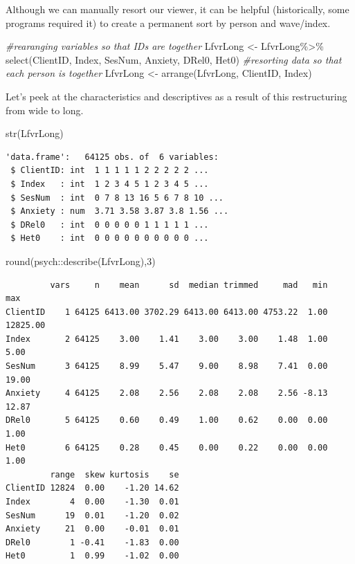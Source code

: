 \documentclass[
  english,
]{book}
\newenvironment{Shaded}{\begin{snugshade}}{\end{snugshade}}
\newcommand{\CommentTok}[1]{\textcolor[rgb]{0.56,0.35,0.01}{\textit{#1}}}
\newcommand{\DecValTok}[1]{\textcolor[rgb]{0.00,0.00,0.81}{#1}}
\newcommand{\FunctionTok}[1]{\textcolor[rgb]{0.00,0.00,0.00}{#1}}
\newcommand{\NormalTok}[1]{#1}
\newcommand{\OtherTok}[1]{\textcolor[rgb]{0.56,0.35,0.01}{#1}}
\newcommand{\SpecialCharTok}[1]{\textcolor[rgb]{0.00,0.00,0.00}{#1}}
\begin{document}
Although we can manually resort our viewer, it can be helpful (historically, some programs required it) to create a permanent sort by person and wave/index.

\begin{Shaded}
\begin{Highlighting}[]
\CommentTok{\#rearanging variables so that IDs are together}
\NormalTok{LfvrLong }\OtherTok{\textless{}{-}}\NormalTok{ LfvrLong}\SpecialCharTok{\%\textgreater{}\%}
  \FunctionTok{select}\NormalTok{(ClientID, Index, SesNum, Anxiety, DRel0, Het0)}
\CommentTok{\#resorting data so that each person is together}
\NormalTok{LfvrLong }\OtherTok{\textless{}{-}} \FunctionTok{arrange}\NormalTok{(LfvrLong, ClientID, Index)}
\end{Highlighting}
\end{Shaded}

Let's peek at the characteristics and descriptives as a result of this restructuring from wide to long.

\begin{Shaded}
\begin{Highlighting}[]
\FunctionTok{str}\NormalTok{(LfvrLong)}
\end{Highlighting}
\end{Shaded}

\begin{verbatim}
'data.frame':   64125 obs. of  6 variables:
 $ ClientID: int  1 1 1 1 1 2 2 2 2 2 ...
 $ Index   : int  1 2 3 4 5 1 2 3 4 5 ...
 $ SesNum  : int  0 7 8 13 16 5 6 7 8 10 ...
 $ Anxiety : num  3.71 3.58 3.87 3.8 1.56 ...
 $ DRel0   : int  0 0 0 0 0 1 1 1 1 1 ...
 $ Het0    : int  0 0 0 0 0 0 0 0 0 0 ...
\end{verbatim}

\begin{Shaded}
\begin{Highlighting}[]
\FunctionTok{round}\NormalTok{(psych}\SpecialCharTok{::}\FunctionTok{describe}\NormalTok{(LfvrLong),}\DecValTok{3}\NormalTok{)}
\end{Highlighting}
\end{Shaded}

\begin{verbatim}
         vars     n    mean      sd  median trimmed     mad   min      max
ClientID    1 64125 6413.00 3702.29 6413.00 6413.00 4753.22  1.00 12825.00
Index       2 64125    3.00    1.41    3.00    3.00    1.48  1.00     5.00
SesNum      3 64125    8.99    5.47    9.00    8.98    7.41  0.00    19.00
Anxiety     4 64125    2.08    2.56    2.08    2.08    2.56 -8.13    12.87
DRel0       5 64125    0.60    0.49    1.00    0.62    0.00  0.00     1.00
Het0        6 64125    0.28    0.45    0.00    0.22    0.00  0.00     1.00
         range  skew kurtosis    se
ClientID 12824  0.00    -1.20 14.62
Index        4  0.00    -1.30  0.01
SesNum      19  0.01    -1.20  0.02
Anxiety     21  0.00    -0.01  0.01
DRel0        1 -0.41    -1.83  0.00
Het0         1  0.99    -1.02  0.00
\end{verbatim}
\end{document}
